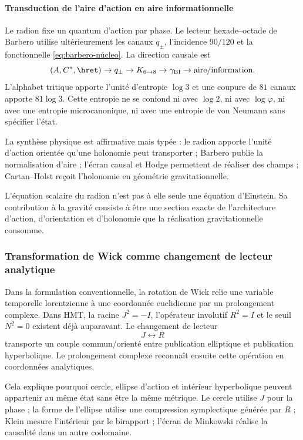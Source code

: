 \paragraph{Transduction de l'aire d'action en aire informationnelle}

Le radion fixe un quantum d'action par phase. Le lecteur hexade--octade de
Barbero utilise ultérieurement les canaux \(q_\pm\), l'incidence \(90/120\) et
la fonctionnelle \eqref{eq:barbero-núcleo}. La direction causale est
\[
(A,C^*,\hret)\to q_\pm\to K_{6\to8}
\to\gamma_{\mathrm{BI}}\to\text{aire/information}.
\]
L'alphabet tritique apporte l'unité d'entropie \(\log3\) et une coupure de
\(81\) canaux apporte \(81\log3\). Cette entropie ne se confond ni avec
\(\log2\), ni avec \(\log\varphi\), ni avec une entropie microcanonique, ni avec une
entropie de von Neumann sans spécifier l'état.

La synthèse physique est affirmative mais typée : le radion apporte l'unité
d'action orientée qu'une holonomie peut transporter ; Barbero publie la
normalisation d'aire ; l'écran causal et Hodge permettent de réaliser des champs ;
Cartan--Holst reçoit l'holonomie en géométrie gravitationnelle.

\begin{statusbox}
L'équation scalaire du radion n'est pas à elle seule une équation d'Einstein. Sa
contribution à la gravité consiste à être une section exacte de l'architecture
d'action, d'orientation et d'holonomie que la réalisation gravitationnelle consomme.
\end{statusbox}

\subsubsection{Transformation de Wick comme changement de lecteur analytique}

Dans la formulation conventionnelle, la rotation de Wick relie une variable
temporelle lorentzienne à une coordonnée euclidienne par un prolongement
complexe. Dans HMT, la racine \(J^2=-I\), l'opérateur involutif \(R^2=I\) et le seuil
\(N^2=0\) existent déjà auparavant. Le changement de lecteur
\[
J\longleftrightarrow R
\]
transporte un couple commun/orienté entre publication elliptique et
publication hyperbolique. Le prolongement complexe reconnaît ensuite cette
opération en coordonnées analytiques.

Cela explique pourquoi cercle, ellipse d'action et intérieur hyperbolique peuvent
appartenir au même état sans être la même métrique. Le cercle utilise \(J\) pour
la phase ; la forme de l'ellipse utilise une compression symplectique générée par \(R\) ; Klein mesure
l'intérieur par le birapport ; l'écran de Minkowski réalise la causalité
dans un autre codomaine.

